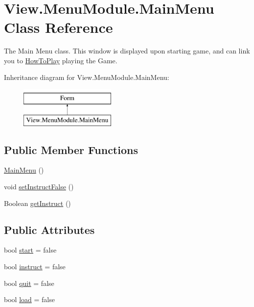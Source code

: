 \hypertarget{class_view_1_1_menu_module_1_1_main_menu}{}\section{View.\+Menu\+Module.\+Main\+Menu Class Reference}
\label{class_view_1_1_menu_module_1_1_main_menu}


The Main Menu class. This window is displayed upon starting game, and can link you to \hyperlink{class_view_1_1_menu_module_1_1_how_to_play}{How\+To\+Play} playing the Game.  


Inheritance diagram for View.\+Menu\+Module.\+Main\+Menu\+:\begin{figure}[H]
\begin{center}
\leavevmode
\includegraphics[height=2.000000cm]{class_view_1_1_menu_module_1_1_main_menu}
\end{center}
\end{figure}
\subsection*{Public Member Functions}
\begin{DoxyCompactItemize}
\item 
\hyperlink{class_view_1_1_menu_module_1_1_main_menu_ad99d87752b73977b41c165162b40b5b2}{Main\+Menu} ()
\item 
void \hyperlink{class_view_1_1_menu_module_1_1_main_menu_aeead85ef08d2596a89b03f16eb65bc21}{set\+Instruct\+False} ()
\item 
Boolean \hyperlink{class_view_1_1_menu_module_1_1_main_menu_a3f0d5695d821475fc57afed16de39982}{get\+Instruct} ()
\end{DoxyCompactItemize}
\subsection*{Public Attributes}
\begin{DoxyCompactItemize}
\item 
bool \hyperlink{class_view_1_1_menu_module_1_1_main_menu_ac97190789e671d423f613617b1ad2480}{start} = false
\item 
bool \hyperlink{class_view_1_1_menu_module_1_1_main_menu_a514b306d7cce15ff72e2ac6be14c2b2a}{instruct} = false
\item 
bool \hyperlink{class_view_1_1_menu_module_1_1_main_menu_addcf92427de2068836c36b3c5de5d28d}{quit} = false
\item 
bool \hyperlink{class_view_1_1_menu_module_1_1_main_menu_a7110a2e6e67e19059e16098e6d0c0760}{load} = false
\end{DoxyCompactItemize}
